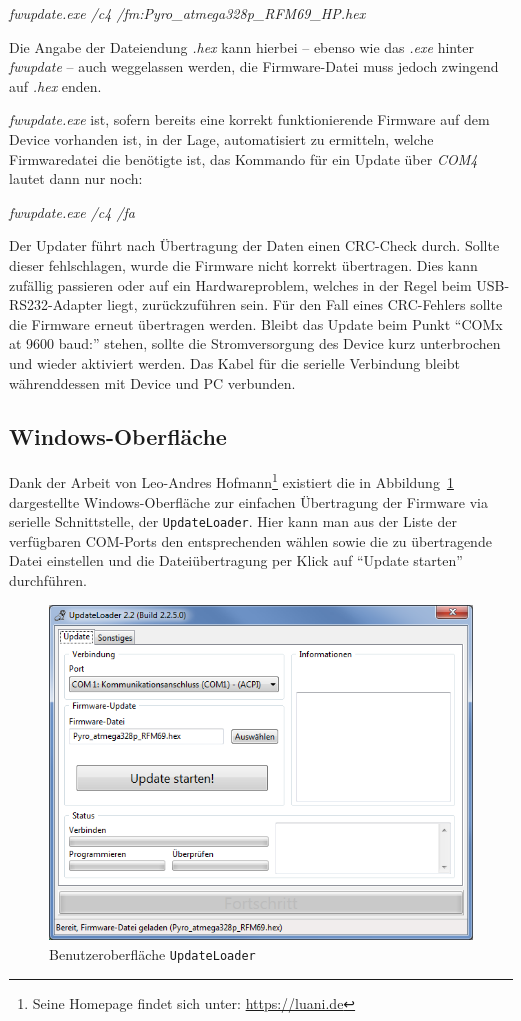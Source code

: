 \documentclass[pdftex, parskip, numbers=noenddot, toc=listof]{scrbook}
\begin{document}
	\begin{center}
		\emph{fwupdate.exe /c4 /fm:Pyro\_atmega328p\_RFM69\_HP.hex}
	\end{center}

	Die Angabe der Dateiendung \emph{.hex} kann hierbei -- ebenso wie das \emph{.exe} hinter \emph{fwupdate} -- auch weggelassen werden, die Firmware-Datei muss jedoch zwingend auf \emph{.hex} enden.

	\emph{fwupdate.exe} ist, sofern bereits eine korrekt funktionierende Firmware auf dem Device vorhanden ist, in der Lage, automatisiert zu ermitteln, welche Firmwaredatei die benötigte ist, das Kommando für ein Update über \emph{COM4} lautet dann nur noch:

	\begin{center}
		\emph{fwupdate.exe /c4 /fa}
	\end{center}

	Der Updater führt nach Übertragung der Daten einen CRC-Check durch. Sollte dieser fehlschlagen, wurde die Firmware nicht korrekt übertragen. Dies kann zufällig passieren oder auf ein Hardwareproblem, welches in der Regel beim USB-RS232-Adapter liegt, zurückzuführen sein. Für den Fall eines CRC-Fehlers sollte die Firmware erneut übertragen werden. Bleibt das Update beim Punkt \enquote{COMx at 9600 baud:} stehen, sollte die Stromversorgung des Device kurz unterbrochen und wieder aktiviert werden. Das Kabel für die serielle Verbindung bleibt währenddessen mit Device und PC verbunden.

	\subsection{Windows-Oberfläche}
	
	Dank der Arbeit von Leo-Andres Hofmann\footnote{Seine Homepage findet sich unter: \url{https://luani.de}} existiert die in Abbildung~\ref{fig:updateloader} dargestellte Windows-Oberfläche zur einfachen Übertragung der Firmware via serielle Schnittstelle, der \texttt{UpdateLoader}. Hier kann man aus der Liste der verfügbaren COM-Ports den entsprechenden wählen sowie die zu übertragende Datei einstellen und die Dateiübertragung per Klick auf \enquote{Update starten} durchführen.
	
	\begin{figure}[!h]
		\centering
		\includegraphics[width = .66\textwidth]{Bilder/updateloader.png}
		\caption{Benutzeroberfläche \texttt{UpdateLoader}}
		\label{fig:updateloader}
	\end{figure}
\end{document}
